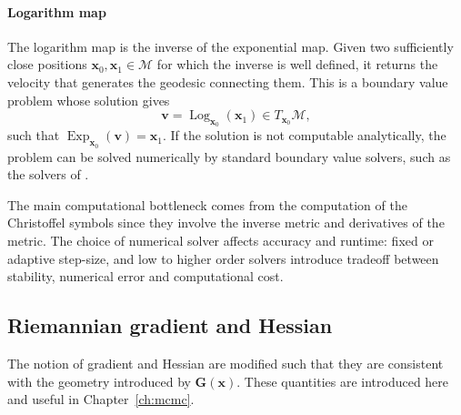 \paragraph{Logarithm map}
The logarithm map is the inverse of the exponential map. Given two sufficiently close positions $\boldsymbol{x}_0, \boldsymbol{x}_1 \in \mathcal{M}$ for which the inverse is well defined, it returns the velocity that generates the geodesic connecting them. This is a boundary value problem whose solution gives 
\begin{equation*}
    \boldsymbol{v} =\operatorname{Log}_{\boldsymbol{x}_0}(\boldsymbol{x}_1)\in T_{\boldsymbol{x}_0}\mathcal{M},
\end{equation*}
such that $\operatorname{Exp}_{\boldsymbol{x}_0}(\boldsymbol{v})=\boldsymbol{x}_1$.
If the solution is not computable analytically, the problem can be solved numerically by standard boundary value solvers, such as the solvers of \citet{2020SciPy-NMeth}. 

The main computational bottleneck comes from the computation of the Christoffel symbols since they involve the inverse metric and derivatives of the metric. The choice of numerical solver affects accuracy and runtime: fixed or adaptive step-size, and low to higher order solvers introduce tradeoff between stability, numerical error and computational cost. 


\subsection{Riemannian gradient and Hessian}
The notion of gradient and Hessian are modified such that they are consistent with the geometry introduced by  $\mathbf{G}(\boldsymbol{x})$. These quantities are introduced here and useful in Chapter~\ref{ch:mcmc}. 

